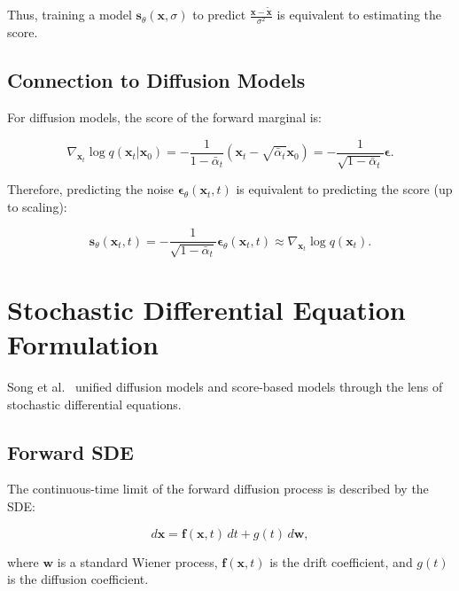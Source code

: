 \documentclass[12pt]{report}
\theoremstyle{definition}
\begin{document}
Thus, training a model $\mathbf{s}_\theta(\mathbf{x}, \sigma)$ to predict $\frac{\mathbf{x} - \tilde{\mathbf{x}}}{\sigma^2}$ is equivalent to estimating the score.

\subsection{Connection to Diffusion Models}

For diffusion models, the score of the forward marginal is:

\begin{equation}
\nabla_{\mathbf{x}_t} \log q(\mathbf{x}_t|\mathbf{x}_0) = -\frac{1}{1 - \bar{\alpha}_t}(\mathbf{x}_t - \sqrt{\bar{\alpha}_t}\mathbf{x}_0) = -\frac{1}{\sqrt{1 - \bar{\alpha}_t}}\boldsymbol{\epsilon}.
\label{eq:score_diffusion}
\end{equation}

Therefore, predicting the noise $\boldsymbol{\epsilon}_\theta(\mathbf{x}_t, t)$ is equivalent to predicting the score (up to scaling):

\begin{equation}
\mathbf{s}_\theta(\mathbf{x}_t, t) = -\frac{1}{\sqrt{1 - \bar{\alpha}_t}}\boldsymbol{\epsilon}_\theta(\mathbf{x}_t, t) \approx \nabla_{\mathbf{x}_t} \log q(\mathbf{x}_t).
\label{eq:score_noise_relation}
\end{equation}

\section{Stochastic Differential Equation Formulation}

Song et al.~\citep{song2020score} unified diffusion models and score-based models through the lens of stochastic differential equations.

\subsection{Forward SDE}

The continuous-time limit of the forward diffusion process is described by the SDE:

\begin{equation}
d\mathbf{x} = \mathbf{f}(\mathbf{x}, t) \, dt + g(t) \, d\mathbf{w},
\label{eq:forward_sde}
\end{equation}

where $\mathbf{w}$ is a standard Wiener process, $\mathbf{f}(\mathbf{x}, t)$ is the drift coefficient, and $g(t)$ is the diffusion coefficient.
\end{document}
